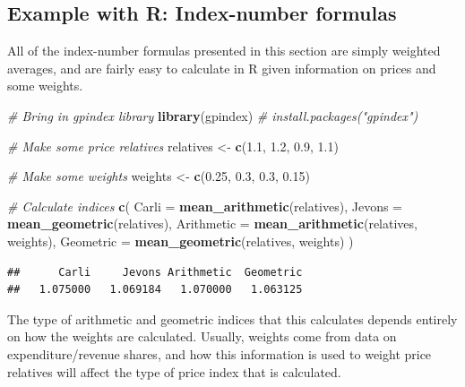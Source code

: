 \documentclass[]{article}
\newenvironment{Shaded}{\begin{snugshade}}{\end{snugshade}}
\newcommand{\CommentTok}[1]{\textcolor[rgb]{0.56,0.35,0.01}{\textit{#1}}}
\newcommand{\DataTypeTok}[1]{\textcolor[rgb]{0.13,0.29,0.53}{#1}}
\newcommand{\FloatTok}[1]{\textcolor[rgb]{0.00,0.00,0.81}{#1}}
\newcommand{\KeywordTok}[1]{\textcolor[rgb]{0.13,0.29,0.53}{\textbf{#1}}}
\newcommand{\NormalTok}[1]{#1}
\newcommand{\StringTok}[1]{\textcolor[rgb]{0.31,0.60,0.02}{#1}}
\begin{document}
\hypertarget{example-with-r-index-number-formulas}{%
\subsection{Example with R: Index-number formulas}\label{example-with-r-index-number-formulas}}

All of the index-number formulas presented in this section are simply weighted averages, and are fairly easy to calculate in R given information on prices and some weights.

\begin{Shaded}
\begin{Highlighting}[]
\CommentTok{# Bring in gpindex library}
\KeywordTok{library}\NormalTok{(gpindex) }\CommentTok{# install.packages("gpindex")}

\CommentTok{# Make some price relatives}
\NormalTok{relatives <-}\StringTok{ }\KeywordTok{c}\NormalTok{(}\FloatTok{1.1}\NormalTok{, }\FloatTok{1.2}\NormalTok{, }\FloatTok{0.9}\NormalTok{, }\FloatTok{1.1}\NormalTok{)}

\CommentTok{# Make some weights}
\NormalTok{weights <-}\StringTok{ }\KeywordTok{c}\NormalTok{(}\FloatTok{0.25}\NormalTok{, }\FloatTok{0.3}\NormalTok{, }\FloatTok{0.3}\NormalTok{, }\FloatTok{0.15}\NormalTok{)}

\CommentTok{# Calculate indices}
\KeywordTok{c}\NormalTok{(}
  \DataTypeTok{Carli =} \KeywordTok{mean_arithmetic}\NormalTok{(relatives), }
  \DataTypeTok{Jevons =} \KeywordTok{mean_geometric}\NormalTok{(relatives), }
  \DataTypeTok{Arithmetic =} \KeywordTok{mean_arithmetic}\NormalTok{(relatives, weights),}
  \DataTypeTok{Geometric =} \KeywordTok{mean_geometric}\NormalTok{(relatives, weights)}
\NormalTok{)}
\end{Highlighting}
\end{Shaded}

\begin{verbatim}
##      Carli     Jevons Arithmetic  Geometric 
##   1.075000   1.069184   1.070000   1.063125
\end{verbatim}

The type of arithmetic and geometric indices that this calculates depends entirely on how the weights are calculated. Usually, weights come from data on expenditure/revenue shares, and how this information is used to weight price relatives will affect the type of price index that is calculated.
\end{document}
